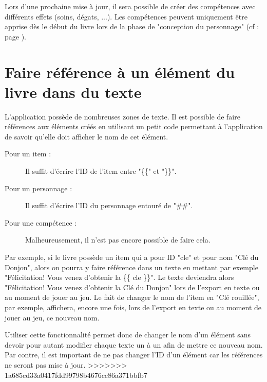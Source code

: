 		Lors d'une prochaine mise à jour, il sera possible de créer des compétences avec différents effets (soins, dégats, ...). Les compétences peuvent uniquement être apprise dès le début du livre lors de la phase de "conception du personnage" (cf :   page \pageref{subsubsec:persoCreationSkill}).

	\section{Faire référence à un élément du livre dans du texte}

		L'application possède de nombreuses zones de texte. Il est possible de faire références aux éléments créés en utilisant un petit code permettant à l'application de savoir qu'elle doit afficher le nom de cet élément.

		\begin{description}
			\item[Pour un item : ]{Il suffit d'écrire l'ID de l'item entre "\{\{" et "\}\}".}
			\item[Pour un personnage : ]{Il suffit d'écrire l'ID du personnage entouré de "\#\#".}
			\item[Pour une compétence : ]{Malheureusement, il n'est pas encore possible de faire cela.}
		\end{description}

		Par exemple, si le livre possède un item qui a pour ID "cle" et pour nom "Clé du Donjon", alors on pourra y faire référence dans un texte en mettant par exemple "Félicitation! Vous venez d'obtenir la \{\{ cle \}\}". Le texte deviendra alors "Félicitation! Vous venez d'obtenir la Clé du Donjon" lors de l'export en texte ou au moment de jouer au jeu. Le fait de changer le nom de l'item en "Clé rouillée", par exemple, affichera, encore une fois, lors de l'export en texte ou au moment de jouer au jeu, ce nouveau nom.

		Utiliser cette fonctionnalité permet donc de changer le nom d'un élément sans devoir pour autant modifier chaque texte un à un afin de mettre ce nouveau nom. Par contre, il est important de ne pas changer l'ID d'un élément car les références ne seront pas mise à jour.
>>>>>>> 1a685cd33a0417fdd99798b4676cc86a371bbfb7
